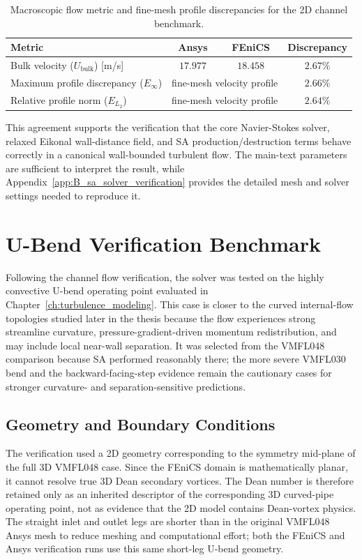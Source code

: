\begin{table}[!ht]
	\centering
	\footnotesize
		\caption{Macroscopic flow metric and fine-mesh profile discrepancies for the 2D channel benchmark.}
		\label{tab:channel_errors}
		\renewcommand{\arraystretch}{1.2}
		\begin{tabularx}{\textwidth}{X c c c}
		\hline
		\textbf{Metric} & \textbf{Ansys} & \textbf{FEniCS} & \textbf{Discrepancy} \\
			\hline
			Bulk velocity ($U_\mathrm{bulk}$) [m/s] & $17.977$ & $18.458$ & $2.67\%$ \\
			Maximum profile discrepancy ($E_{\infty}$) & \multicolumn{2}{c}{fine-mesh velocity profile} & $2.66\%$ \\
			Relative profile norm ($E_{L_2}$) & \multicolumn{2}{c}{fine-mesh velocity profile} & $2.64\%$ \\
			\hline
		\end{tabularx}
	\end{table}

This agreement supports the verification that the core Navier-Stokes solver, relaxed Eikonal wall-distance field, and SA production/destruction terms behave correctly in a canonical wall-bounded turbulent flow. The main-text parameters are sufficient to interpret the result, while Appendix~\ref{app:B_sa_solver_verification} provides the detailed mesh and solver settings needed to reproduce it.

\section{U-Bend Verification Benchmark}
\label{sec:sa_ubend_verification}
Following the channel flow verification, the solver was tested on the highly convective U-bend operating point evaluated in Chapter~\ref{ch:turbulence_modeling}. This case is closer to the curved internal-flow topologies studied later in the thesis because the flow experiences strong streamline curvature, pressure-gradient-driven momentum redistribution, and may include local near-wall separation. It was selected from the VMFL048 comparison because SA performed reasonably there; the more severe VMFL030 bend and the backward-facing-step evidence remain the cautionary cases for stronger curvature- and separation-sensitive predictions.

\subsection{Geometry and Boundary Conditions}
\label{subsec:sa_ubend_geometry_bcs}
The verification used a 2D geometry corresponding to the symmetry mid-plane of the full 3D VMFL048 case. Since the FEniCS domain is mathematically planar, it cannot resolve true 3D Dean secondary vortices. The Dean number is therefore retained only as an inherited descriptor of the corresponding 3D curved-pipe operating point, not as evidence that the 2D model contains Dean-vortex physics. The straight inlet and outlet legs are shorter than in the original VMFL048 Ansys mesh to reduce meshing and computational effort; both the FEniCS and Ansys verification runs use this same short-leg U-bend geometry.

